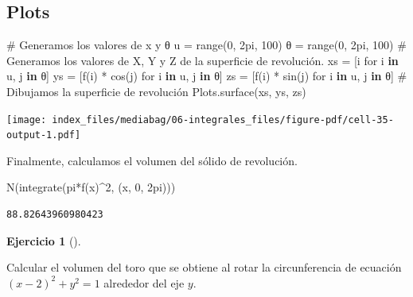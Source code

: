 \documentclass[
  a4paper,
]{scrreport}
\newenvironment{Shaded}{\begin{snugshade}}{\end{snugshade}}
\newcommand{\CommentTok}[1]{\textcolor[rgb]{0.37,0.37,0.37}{#1}}
\newcommand{\FloatTok}[1]{\textcolor[rgb]{0.68,0.00,0.00}{#1}}
\newcommand{\FunctionTok}[1]{\textcolor[rgb]{0.28,0.35,0.67}{#1}}
\newcommand{\KeywordTok}[1]{\textcolor[rgb]{0.00,0.23,0.31}{\textbf{#1}}}
\newcommand{\NormalTok}[1]{\textcolor[rgb]{0.00,0.23,0.31}{#1}}
\newcommand{\OperatorTok}[1]{\textcolor[rgb]{0.37,0.37,0.37}{#1}}
\theoremstyle{definition}
\newtheorem{exercise}{Ejercicio}[chapter]
\theoremstyle{remark}
\begin{document}
\begin{tcolorbox}
\section{Plots}

\begin{Shaded}
\begin{Highlighting}[]
\CommentTok{\# Generamos los valores de x y θ}
\NormalTok{u }\OperatorTok{=} \FunctionTok{range}\NormalTok{(}\FloatTok{0}\NormalTok{, }\FloatTok{2}\NormalTok{pi, }\FloatTok{100}\NormalTok{)}
\NormalTok{θ }\OperatorTok{=} \FunctionTok{range}\NormalTok{(}\FloatTok{0}\NormalTok{, }\FloatTok{2}\NormalTok{pi, }\FloatTok{100}\NormalTok{)}
\CommentTok{\# Generamos los valores de X, Y y Z de la superficie de revolución.}
\NormalTok{xs }\OperatorTok{=}\NormalTok{ [i for i }\KeywordTok{in}\NormalTok{ u, j }\KeywordTok{in}\NormalTok{ θ]}
\NormalTok{ys }\OperatorTok{=}\NormalTok{ [}\FunctionTok{f}\NormalTok{(i) }\OperatorTok{*} \FunctionTok{cos}\NormalTok{(j) for i }\KeywordTok{in}\NormalTok{ u, j }\KeywordTok{in}\NormalTok{ θ]}
\NormalTok{zs }\OperatorTok{=}\NormalTok{ [}\FunctionTok{f}\NormalTok{(i) }\OperatorTok{*} \FunctionTok{sin}\NormalTok{(j) for i }\KeywordTok{in}\NormalTok{ u, j }\KeywordTok{in}\NormalTok{ θ]}
\CommentTok{\# Dibujamos la superficie de revolución}
\NormalTok{Plots.}\FunctionTok{surface}\NormalTok{(xs, ys, zs)}
\end{Highlighting}
\end{Shaded}

\texttt{[image: index\_files/mediabag/06-integrales\_files/figure-pdf/cell-35-output-1.pdf]}

Finalmente, calculamos el volumen del sólido de revolución.

\begin{Shaded}
\begin{Highlighting}[]
\FunctionTok{N}\NormalTok{(}\FunctionTok{integrate}\NormalTok{(}\FunctionTok{pi*f}\NormalTok{(x)}\OperatorTok{\^{}}\FloatTok{2}\NormalTok{, (x, }\FloatTok{0}\NormalTok{, }\FloatTok{2}\NormalTok{pi)))}
\end{Highlighting}
\end{Shaded}

\begin{verbatim}
88.82643960980423
\end{verbatim}

\end{tcolorbox}

\begin{exercise}[]\protect\hypertarget{exr-solido-revolucion-envolventes}{}\label{exr-solido-revolucion-envolventes}

Calcular el volumen del toro que se obtiene al rotar la circunferencia
de ecuación \((x-2)^2+y^2=1\) alrededor del eje \(y\).

\end{exercise}
\end{document}
